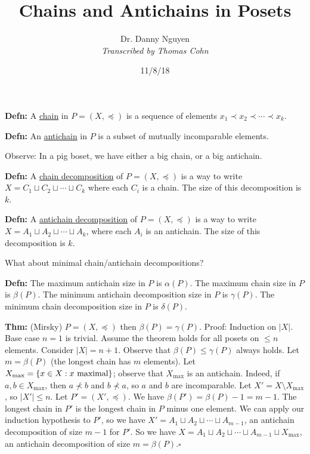 \documentclass[10pt,letterpaper]{article}
\author{Dr. Danny Nguyen\\ \small\textit{Transcribed by Thomas Cohn}}
\title{Chains and Antichains in Posets}
\date{11/8/18} %
\newcommand{\n}{\hfill\break}
\newcommand{\defn}[1]{\par\noindent\settowidth{\hangindent}{\textbf{Defn: }}\textbf{Defn: }#1\n}
\newcommand{\thm}[1]{\par\noindent\settowidth{\hangindent}{\textbf{Thm: }}\textbf{Thm: }#1\n}
\newcommand{\proven}{\;$\square$\n}
\newcommand{\ptxt}[1]{\textrm{\textnormal{#1}}}
\newcommand{\card}[1]{\left|#1\right|}
\newcommand{\set}[1]{\left\{#1\right\}}
\begin{document}
\maketitle
\setlength\RaggedRightParindent{\parindent}
\RaggedRight

\defn{A \underline{chain} in $P=(X,\preceq)$ is a sequence of elements $x_{1}\prec{}x_{2}\prec\cdots\prec{}x_{k}$.}

\defn{An \underline{antichain} in $P$ is a subset of mutually incomparable elements.}

\par\noindent Observe: In a pig boset, we have either a big chain, or a big antichain.\n

\defn{A \underline{chain decomposition} of $P=(X,\preceq)$ is a way to write $X=C_{1}\sqcup{}C_{2}\sqcup\cdots\sqcup{}C_{k}$ where each $C_{i}$ is a chain. The size of this decomposition is $k$.}

\defn{A \underline{antichain decomposition} of $P=(X,\preceq)$ is a way to write $X=A_{1}\sqcup{}A_{2}\sqcup\cdots\sqcup{}A_{k}$, where each $A_{i}$ is an antichain. The size of this decomposition is $k$.}

\par\noindent What about minimal chain/antichain decompositions?\n

\defn{The maximum antichain size in $P$ is $\alpha(P)$.\n
The maximum chain size in $P$ is $\beta(P)$.\n
The minimum antichain decomposition size in $P$ is $\gamma(P)$.\n
The minimum chain decomposition size in $P$ is $\delta(P)$.}

\thm{(Mirsky) $P=(X,\preceq)$ then $\beta(P)=\gamma(P)$.\n
Proof: Induction on $\card{X}$. Base case $n=1$ is trivial. Assume the theorem holds for all posets on $\le{}n$ elements. Consider $\card{X}=n+1$.\n
Observe that $\beta(P)\le\gamma(P)$ always holds.\n
Let $m=\beta(P)$ (the longest chain has $m$ elements). Let $X_{\max}=\set{x\in{}X:x\ptxt{ maximal}}$; observe that $X_{\max}$ is an antichain. Indeed, if $a,b\in{}X_{\max}$, then $a\nprec{}b$ and $b\nprec{}a$, so $a$ and $b$ are incomparable. Let $X'=X\setminus{}X_{\max}$, so $\card{X'}\le{}n$. Let $P'=(X',\preceq)$. We have $\beta(P')=\beta(P)-1=m-1$. The longest chain in $P'$ is the longest chain in $P$ minus one element. We can apply our induction hypothesis to $P'$, so we have $X'=A_{1}\sqcup{}A_{2}\sqcup\cdots\sqcup{}A_{m-1}$, an antichain decomposition of size $m-1$ for $P'$. So we have $X=A_{1}\sqcup{}A_{2}\sqcup\cdots\sqcup{}A_{m-1}\sqcup{}X_{\max}$, an antichain decomposition of size $m=\beta(P)$.\proven}
\end{document}
